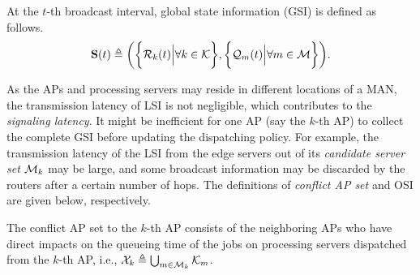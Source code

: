 %
\begin{definition}
    At the $t$-th broadcast interval, global state information (GSI) is defined as follows.
    {\small
    \begin{align}
        \mathbf{S}(t) \triangleq
            \bigg(
                \bigg\{\mathcal{R}_{k}(t) \Big| \forall k\in\mathcal{K}\bigg\},
                \bigg\{\mathcal{Q}_{m}(t) \Big| \forall m\in\mathcal{M}\bigg\}
            \bigg).
    \end{align}
    }%
\end{definition}

%
As the APs and processing servers may reside in different locations of a MAN, the transmission latency of LSI is not negligible, which contributes to the \emph{signaling latency}.
It might be inefficient for one AP (say the $k$-th AP) to collect the complete GSI before updating the dispatching policy.
For example, the transmission latency of the LSI from the edge servers out of its \emph{candidate server set} $\mathcal{M}_{k}$ may be large, and some broadcast information may be discarded by the routers after a certain number of hops.
%
The definitions of \emph{conflict AP set} and OSI are given below, respectively.
\begin{definition}
    The conflict AP set to the $k$-th AP consists of the neighboring APs who have direct impacts on the queueing time of the jobs on processing servers dispatched from the $k$-th AP, i.e., $ \mathcal{X}_{k} \triangleq \bigcup_{m\in\mathcal{M}_{k}} \mathcal{K}_{m}$.
\end{definition}

